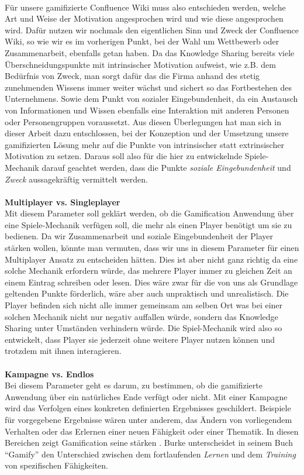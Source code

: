 \documentclass[a4paper,12pt,twoside]{scrartcl}
\begin{document}
\\
Für unsere gamifizierte Confluence Wiki muss also entschieden werden, welche Art und Weise der Motivation angesprochen wird und wie diese angesprochen wird. Dafür nutzen wir nochmals den eigentlichen Sinn und Zweck der Confluence Wiki, so wie wir es im vorherigen Punkt, bei der Wahl um Wettbewerb oder Zusammenarbeit, ebenfalls getan haben. Da das Knowledge Sharing bereits viele Überschneidungspunkte  mit intrinsischer Motivation aufweist, wie z.B. dem Bedürfnis von Zweck, man sorgt dafür das die Firma anhand des stetig zunehmenden Wissens immer weiter wächst und sichert so das Fortbestehen des Unternehmens. Sowie dem Punkt von sozialer Eingebundenheit, da ein Austausch von Informationen und Wissen ebenfalls eine Interaktion mit anderen Personen oder Personengruppen voraussetzt. Aus diesen Überlegungen hat man sich in dieser Arbeit dazu entschlossen, bei der Konzeption und der Umsetzung unsere gamifizierten Lösung mehr auf die Punkte von intrinsischer statt extrinsischer Motivation zu setzen. Daraus soll also für die hier zu entwickelnde Spiele-Mechanik darauf geachtet werden, dass die Punkte \textit{soziale Eingebundenheit} und \textit{Zweck} aussagekräftig vermittelt werden.
\\\\
\textbf{Multiplayer vs. Singleplayer}\\
Mit diesem Parameter soll geklärt werden, ob die Gamification Anwendung über eine Spiele-Mechanik verfügen soll, die mehr als einen Player benötigt um sie zu bedienen. Da wir Zusammenarbeit und soziale Eingebundenheit der Player stärken wollen, könnte man vermuten, dass wir uns in diesem Parameter für einen Multiplayer Ansatz zu entscheiden hätten. Dies ist aber nicht ganz richtig da eine solche Mechanik erfordern würde, das mehrere Player immer zu gleichen Zeit an einem Eintrag schreiben oder lesen. Dies wäre zwar für die von uns als Grundlage geltenden Punkte förderlich, wäre aber auch unpraktisch und unrealistisch. Die Player befinden sich nicht alle immer gemeinsam am selben Ort was bei einer solchen Mechanik nicht nur negativ auffallen würde, sondern das Knowledge Sharing unter Umständen verhindern würde. Die Spiel-Mechanik wird also so entwickelt, dass Player sie jederzeit ohne weitere Player nutzen können und trotzdem mit ihnen interagieren.
\\\\
\textbf{Kampagne vs. Endlos}\\
Bei diesem Parameter geht es darum, zu bestimmen, ob die gamifizierte Anwendung über ein natürliches Ende verfügt oder nicht. Mit einer Kampagne wird das Verfolgen eines konkreten definierten Ergebnisses geschildert. Beispiele für vorgegebene Ergebnisse wären unter anderem, das Ändern von vorliegendem Verhalten oder das Erlernen einer neuen Fähigkeit oder einer Thematik. In diesen Bereichen zeigt Gamification seine stärken \cite{gamificationDefinition}. Burke unterscheidet in seinem Buch \enquote{Gamify} den Unterschied zwischen dem fortlaufenden \textit{Lernen} und dem \textit{Training} von spezifischen Fähigkeiten.
\end{document}
